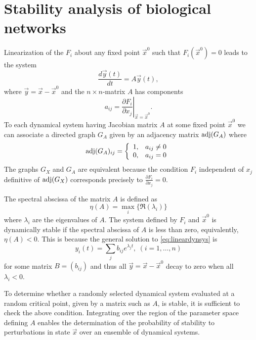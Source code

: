\section{Stability analysis of biological networks}
Linearization of the $F_i$ about any fixed point $\vec{x}^0$ such that $F_i(\vec{x}^0)=0$ leads to the system
\begin{equation}\label{eq:lineardynsys}
\frac{d\vec{y}(t)}{dt} = A \vec{y}(t),
\end{equation}
where $\vec{y} = \vec{x} - \vec{x}^0$ and the $n \times n$-matrix $A$ has components
$$
a_{ij} = \left. \frac{\partial F_i}{\partial x_j} \right|_{\vec{x} = \vec{x}^0}.
$$
To each dynamical system having Jacobian matrix $A$ at some fixed point $\vec{x}^0$ we can associate a directed graph $G_A$ given by an adjacency matrix $\mathrm{adj}(G_A)$ where
 \begin{displaymath}
   \mathrm{adj}(G_A)_{ij} = \left\{
     \begin{array}{lr}
       1, & a_{ij} \neq 0\\
       0, & a_{ij} = 0
     \end{array}
   \right.
\end{displaymath}
The graphs $G_X$ and $G_A$ are equivalent because the condition $F_i$ independent of $x_j$ definitive of $\mathrm{adj}(G_X)$ corresponds precisely to $\frac{\partial F_i}{\partial x_j}=0$.

The spectral abscissa of the matrix $A$ is defined as
$$
\eta(A) = \max_i \{\Re(\lambda_i)\}
$$
where $\lambda_i$ are the eigenvalues of $A$. The system defined by $F_i$ and $\vec{x}^0$ is dynamically stable if the spectral abscissa of $A$ is less than zero, equivalently, $\eta(A) < 0$. This is because the general solution to \ref{eq:lineardynsys} is
$$
y_i(t) = \sum_j b_{ij} e^{\lambda_j t}, \; (i=1,\ldots,n)
$$
for some matrix $B=(b_{ij})$ and thus all $\vec{y} = \vec{x} - \vec{x}^0$ decay to zero when all $\lambda_i < 0$.

To determine whether a randomly selected dynamical system evaluated at a random critical point, given by a matrix such as $A$, is stable, it is sufficient to check the above condition. Integrating over the region of the parameter space defining $A$ enables the determination of the probability of stability to perturbations in state $\vec{x}$ over an ensemble of dynamical systems.

